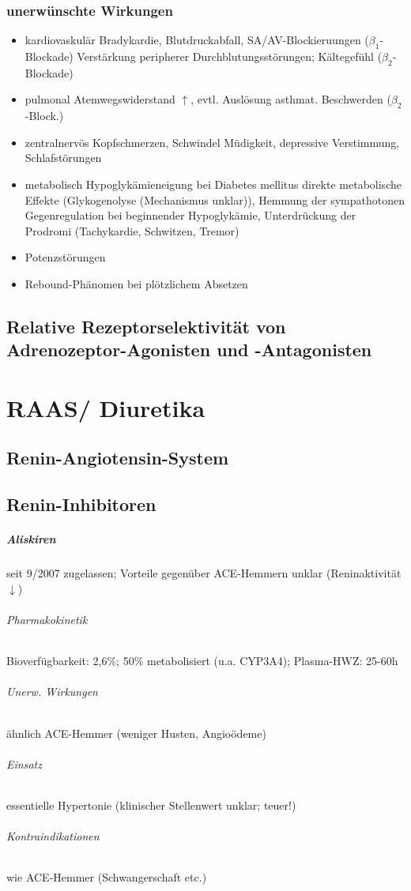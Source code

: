 \documentclass[10pt,a4paper]{report}
\begin{document}
\subsection{unerwünschte Wirkungen}
\begin{itemize}
	\item kardiovaskulär 
	Bradykardie, Blutdruckabfall, SA/AV-Blockieruungen ($\beta_1$-Blockade)
	Verstärkung peripherer Durchblutungsstörungen; Kältegefühl ($\beta_2$-Blockade)
	\item pulmonal 
	Atemwegswiderstand $\uparrow$, evtl. Auslösung asthmat. Beschwerden ($\beta_2$-Block.)
	\item zentralnervös 
	Kopfschmerzen, Schwindel
	Müdigkeit, depressive Verstimmung, Schlafstörungen
	\item metabolisch 
	Hypoglykämieneigung bei Diabetes mellitus 
direkte metabolische Effekte (Glykogenolyse (Mechanismus unklar)), Hemmung der sympathotonen Gegenregulation bei beginnender Hypoglykämie, Unterdrückung der Prodromi (Tachykardie, Schwitzen, Tremor)
	\item Potenzstörungen
	\item Rebound-Phänomen bei plötzlichem Absetzen
\end{itemize}
\section{Relative Rezeptorselektivität von Adrenozeptor-Agonisten und -Antagonisten}
\chapter{RAAS/ Diuretika}
\section{Renin-Angiotensin-System}
\section{Renin-Inhibitoren}
\paragraph{Aliskiren}seit 9/2007 zugelassen; Vorteile gegenüber ACE-Hemmern unklar (Reninaktivität$\downarrow$)
\subparagraph{Pharmakokinetik}Bioverfügbarkeit: 2,6\%; 50\% metabolisiert (u.a. CYP3A4); Plasma-HWZ: 25-60h
\subparagraph{Unerw. Wirkungen} ähnlich ACE-Hemmer (weniger Husten, Angioödeme)
\subparagraph{Einsatz} essentielle Hypertonie (klinischer Stellenwert unklar; teuer!)
\subparagraph{Kontraindikationen} wie ACE-Hemmer (Schwangerschaft etc.)
\end{document}
